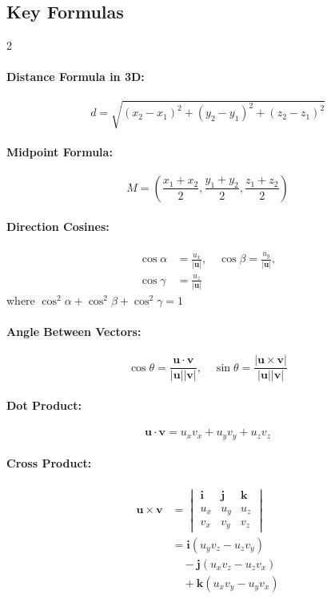 \subsection*{Key Formulas}
\begin{multicols}{2}
\paragraph{Distance Formula in 3D:}
\[
d = \sqrt{(x_2 - x_1)^2 + (y_2 - y_1)^2 + (z_2 - z_1)^2}
\]

\paragraph{Midpoint Formula:}
\[
M = \left(\frac{x_1 + x_2}{2}, \frac{y_1 + y_2}{2}, \frac{z_1 + z_2}{2}\right)
\]

\paragraph{Direction Cosines:} 
\[
\begin{aligned}
\cos \alpha &= \frac{u_x}{|\mathbf{u}|}, \quad
\cos \beta = \frac{u_y}{|\mathbf{u}|}, \\
\cos \gamma &= \frac{u_z}{|\mathbf{u}|}
\end{aligned}
\]
where $\cos^2 \alpha + \cos^2 \beta + \cos^2 \gamma = 1$

\paragraph{Angle Between Vectors:} 
\[
\cos \theta = \frac{\mathbf{u} \cdot \mathbf{v}}{|\mathbf{u}||\mathbf{v}|}, \quad
\sin \theta = \frac{|\mathbf{u} \times \mathbf{v}|}{|\mathbf{u}||\mathbf{v}|}
\]

\paragraph{Dot Product:}
\[
\mathbf{u} \cdot \mathbf{v} = u_x v_x + u_y v_y + u_z v_z
\]

\paragraph{Cross Product:}
\begin{align*}
\mathbf{u} \times \mathbf{v} &= \begin{vmatrix}
\mathbf{i} & \mathbf{j} & \mathbf{k} \\
u_x & u_y & u_z \\
v_x & v_y & v_z
\end{vmatrix} \\
&= \mathbf{i}(u_y v_z - u_z v_y) \\
&\quad - \mathbf{j}(u_x v_z - u_z v_x) \\
&\quad + \mathbf{k}(u_x v_y - u_y v_x)
\end{align*}


\end{multicols}
